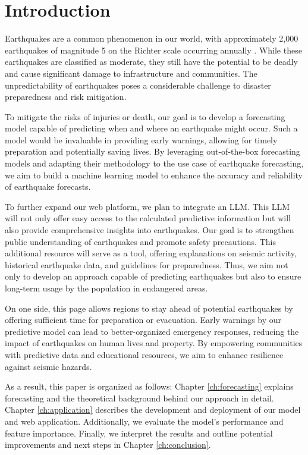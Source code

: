
\chapter{Introduction}
Earthquakes are a common phenomenon in our world, with approximately 2,000 earthquakes
of magnitude 5 on the Richter scale occurring annually \parencite{welt_erdbeben}.
While these earthquakes are classified as moderate, they still have the potential
to be deadly and cause significant damage to infrastructure and communities. The
unpredictability of earthquakes poses a considerable challenge to disaster preparedness
and risk mitigation.

To mitigate the risks of injuries or death, our goal is to develop a forecasting model
capable of predicting when and where an earthquake might occur. Such a model would be
invaluable in providing early warnings, allowing for timely preparation and potentially
saving lives. By leveraging out-of-the-box forecasting models and adapting their methodology
to the use case of earthquake forecasting, we aim to build a machine learning model to
enhance the accuracy and reliability of earthquake forecasts.

To further expand our web platform, we plan to integrate an \ac{LLM}. This \ac{LLM}
will not only offer easy access to the calculated predictive information but will
also provide comprehensive insights into earthquakes. Our goal is to strengthen public
understanding of earthquakes and promote safety precautions. This additional resource
will serve as a tool, offering explanations on seismic activity, historical earthquake
data, and guidelines for preparedness. Thus, we aim not only to develop an approach
capable of predicting earthquakes but also to ensure long-term usage by the population
in endangered areas.

On one side, this page allows regions to stay ahead of potential earthquakes by offering
sufficient time for preparation or evacuation. Early warnings by our predictive model can
lead to better-organized emergency responses, reducing the impact of earthquakes on human
lives and property. By empowering communities with predictive data and educational resources,
we aim to enhance resilience against seismic hazards.

As a result, this paper is organized as follows: Chapter \ref{ch:forecasting} explains
forecasting and the theoretical background behind our approach in detail. Chapter
\ref{ch:application} describes the development and deployment of our model and web
application. Additionally, we evaluate the model's performance and feature importance.
Finally, we interpret the results and outline potential improvements and next steps in
Chapter \ref{ch:conclusion}.